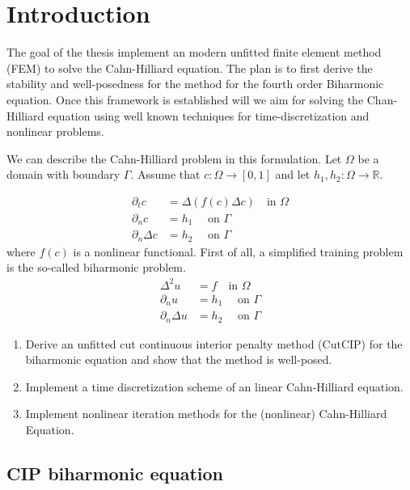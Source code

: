 \section{Introduction}\label{sec:introduction}
The goal of the thesis implement an modern unfitted finite element method (FEM) to solve the Cahn-Hilliard equation. The plan is to first derive the stability and well-posedness for the method for the fourth order Biharmonic equation. Once this framework is established will we aim for solving the Chan-Hilliard equation using well known techniques for time-discretization and nonlinear problems.

We can describe the Cahn-Hilliard problem in this formulation. Let $\Omega  $ be a domain with boundary $\Gamma $. Assume that $c: \Omega  \to \left[ 0,1 \right] $ and let $h_{1},h_{2}:\Omega  \to \mathbb{R} $.

\[
    \begin{split}
\partial _{t} c &= \Delta ( f(c) \Delta c)     \quad  \text{in } \Omega \\
\partial _{n} c & = h_{1} \quad \text{ on } \Gamma  \\
\partial _{n} \Delta c  & = h_{2} \quad \text{ on } \Gamma
    \end{split}
\]
where $f( c) $ is a nonlinear functional. First of all, a simplified training problem is the so-called biharmonic problem.
\[
    \begin{split}
\Delta ^2 u & = f \quad  \text{in } \Omega \\
\partial _{n} u & = h_{1} \quad \text{ on } \Gamma  \\
\partial _{n} \Delta u  & = h_{2} \quad \text{ on } \Gamma
    \end{split}
\]



\begin{enumerate}[label=(\alph*)]
    \item Derive an unfitted cut continuous interior penalty method (CutCIP) for the biharmonic equation and show that the method is well-posed.
    \item Implement a time discretization scheme of an linear Cahn-Hilliard equation.
    \item Implement nonlinear iteration methods for the (nonlinear) Cahn-Hilliard Equation.
\end{enumerate}



\subsection{CIP biharmonic equation}%
\label{sub:cip_biharmonic_equation}


